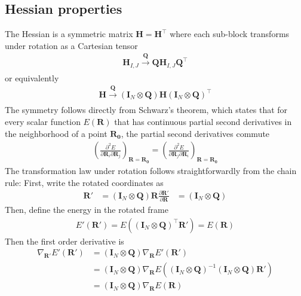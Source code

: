 \documentclass[pdflatex,sn-mathphys-num]{sn-jnl}%
\theoremstyle{thmstyleone}%
\theoremstyle{thmstyletwo}%
\theoremstyle{thmstylethree}%
\begin{document}
\begin{appendices}
\subsection{Hessian properties}
\label{sec:hessian_properties}
The Hessian is a symmetric matrix $\mathbf{H}=\mathbf{H}^\top$ where each sub-block transforms under rotation as a Cartesian tensor
\begin{align}
    \mathbf{H}_{I,J} \xrightarrow[]{\mathbf{Q}} \mathbf{Q} \mathbf{H}_{I,J} \mathbf{Q}^\top 
\end{align}
or equivalently
\begin{align}
    \mathbf{H} \xrightarrow[]{\mathbf{Q}} (\mathbf{I}_{N} \otimes \mathbf{Q})\mathbf{H} (\mathbf{I}_{N} \otimes \mathbf{Q})^\top 
\end{align}
The symmetry follows directly from Schwarz's theorem, which states that for every scalar function $E(\mathbf{R})$ that has continuous partial second derivatives in the neighborhood of a point $\mathbf{R_0}$, the partial second derivatives commute
\begin{align}
    \left(\frac{\partial^2 E}{\partial \mathbf{R}_i \partial \mathbf{R}_j}\right)_{\mathbf{R}=\mathbf{R_0}} = \left(\frac{\partial^2 E}{\partial \mathbf{R}_j \partial \mathbf{R}_i}\right)_{\mathbf{R}=\mathbf{R_0}}
\end{align}
The transformation law under rotation follows straightforwardly from the chain rule: 
First, write the rotated coordinates as
\begin{align}
    \mathbf{R}' &= (\mathbf{I}_{N} \otimes \mathbf{Q}) \mathbf{R} 
    \frac{\partial \mathbf{R}'}{\partial \mathbf{R}} &= (\mathbf{I}_{N} \otimes \mathbf{Q})
\end{align}
Then, define the energy in the rotated frame
\begin{align}
    E'(\mathbf{R}') = E((\mathbf{I}_{N} \otimes \mathbf{Q})^\top \mathbf{R}') = E(\mathbf{R})
\end{align}
Then the first order derivative is
\begin{align}
    \nabla_\mathbf{R'}E'(\mathbf{R'}) &= (\mathbf{I}_{N} \otimes \mathbf{Q}) \nabla_\mathbf{R} E'(\mathbf{R}') \\
    &= (\mathbf{I}_{N} \otimes \mathbf{Q}) \nabla_\mathbf{R} E((\mathbf{I}_{N} \otimes \mathbf{Q})^{-1} (\mathbf{I}_{N} \otimes \mathbf{Q}) \mathbf{R}') \\
    &= (\mathbf{I}_{N} \otimes \mathbf{Q}) \nabla_\mathbf{R} E(\mathbf{R})
\end{align}

\end{appendices}
\end{document}
